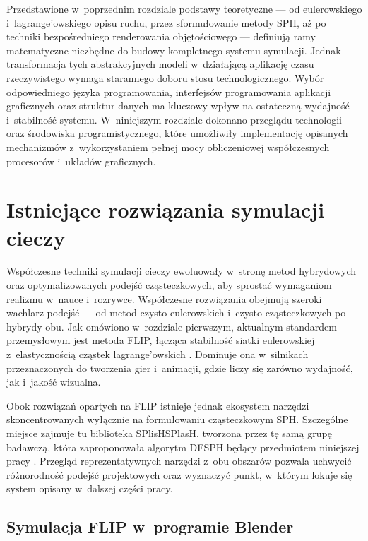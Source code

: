Przedstawione w~poprzednim rozdziale podstawy teoretyczne --- od eulerowskiego
i~lagrange'owskiego opisu ruchu, przez sformułowanie metody SPH, aż po techniki bezpośredniego
renderowania objętościowego --- definiują ramy matematyczne niezbędne do budowy kompletnego systemu symulacji.
Jednak transformacja tych abstrakcyjnych modeli w~działającą aplikację czasu rzeczywistego wymaga starannego
doboru stosu technologicznego. Wybór odpowiedniego języka programowania, interfejsów programowania aplikacji
graficznych oraz struktur danych ma kluczowy wpływ na ostateczną wydajność i~stabilność systemu.
W~niniejszym rozdziale dokonano przeglądu technologii oraz środowiska programistycznego, które umożliwiły
implementację opisanych mechanizmów z~wykorzystaniem pełnej mocy obliczeniowej współczesnych procesorów
i~układów graficznych.

\section{Istniejące rozwiązania symulacji cieczy}

Współczesne techniki symulacji cieczy ewoluowały w~stronę metod hybrydowych oraz optymalizowanych 
podejść cząsteczkowych, aby sprostać wymaganiom realizmu w~nauce i~rozrywce. Współczesne rozwiązania
obejmują szeroki wachlarz podejść --- od metod czysto eulerowskich i~czysto cząsteczkowych po hybrydy obu. 
Jak omówiono w~rozdziale pierwszym, aktualnym standardem przemysłowym jest metoda FLIP, łącząca stabilność 
siatki eulerowskiej z~elastycznością cząstek lagrange'owskich \cite{brackbill1986flip}. 
Dominuje ona w~silnikach przeznaczonych do tworzenia gier i~animacji, gdzie liczy się zarówno wydajność, 
jak i~jakość wizualna.

Obok rozwiązań opartych na FLIP istnieje jednak ekosystem narzędzi skoncentrowanych wyłącznie 
na formułowaniu cząsteczkowym SPH. Szczególne miejsce zajmuje tu biblioteka SPlisHSPlasH, 
tworzona przez tę samą grupę badawczą, która zaproponowała algorytm DFSPH będący przedmiotem 
niniejszej pracy \cite{SPlisHSPlasH_Library, bender2015divergence}. 
Przegląd reprezentatywnych narzędzi z~obu obszarów pozwala uchwycić różnorodność 
podejść projektowych oraz wyznaczyć punkt, w~którym lokuje się system opisany w~dalszej części pracy.

\subsection{Symulacja FLIP w~programie Blender}


